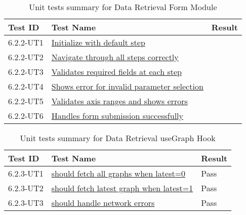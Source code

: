 \documentclass[12pt, titlepage]{article}
\begin{document}
\begin{table}[H]
  \centering
  \begin{tabular}{|l|l|l|}
    \hline
    \textbf{Test ID} & \textbf{Test Name} & \textbf{Result}\\
    \hline
    6.2.2-UT1 & \href{https://github.com/SumanyaG/Alkalytics/blob/documentation/VnV/src/frontend/test/components/modals/DataFormModel.test.tsx}{Initialize with default step} &  \\
    \hline
    6.2.2-UT2 & \href{https://github.com/SumanyaG/Alkalytics/blob/documentation/VnV/src/frontend/test/components/modals/DataFormModel.test.tsx}{Navigate through all steps correctly} &  \\
    \hline
    6.2.2-UT3 & \href{https://github.com/SumanyaG/Alkalytics/blob/documentation/VnV/src/frontend/test/components/modals/DataFormModel.test.tsx}{Validates required fields at each step} &  \\
    \hline
    6.2.2-UT4 & \href{https://github.com/SumanyaG/Alkalytics/blob/documentation/VnV/src/frontend/test/components/modals/DataFormModel.test.tsx}{Shows error for invalid parameter selection} &  \\
    \hline
    6.2.2-UT5 & \href{https://github.com/SumanyaG/Alkalytics/blob/documentation/VnV/src/frontend/test/components/modals/DataFormModel.test.tsx}{Validates axis ranges and shows errors} &  \\
    \hline
    6.2.2-UT6 & \href{https://github.com/SumanyaG/Alkalytics/blob/documentation/VnV/src/frontend/test/components/modals/DataFormModel.test.tsx}{Handles form submission successfully} &  \\
    \hline
  \end{tabular}
  \caption{Unit tests summary for Data Retrieval Form Module}
  \label{UT:DataRetrieval2}
\end{table}


\begin{table}[H]
  \centering
  \begin{tabular}{|l|l|l|}
    \hline
    \textbf{Test ID} & \textbf{Test Name} & \textbf{Result}\\
    \hline
    6.2.3-UT1 & \href{https://github.com/SumanyaG/Alkalytics/blob/documentation/VnV/src/frontend/test/components/modals/DataFormModel.test.tsx}{should fetch all graphs when latest=0} & Pass \\
    \hline
    6.2.3-UT2 & \href{https://github.com/SumanyaG/Alkalytics/blob/documentation/VnV/src/frontend/test/components/modals/DataFormModel.test.tsx}{should fetch latest graph when latest=1} & Pass \\
    \hline
    6.2.3-UT3 & \href{https://github.com/SumanyaG/Alkalytics/blob/documentation/VnV/src/frontend/test/components/modals/DataFormModel.test.tsx}{should handle network errors} & Pass \\
    \hline
  \end{tabular}
  \caption{Unit tests summary for Data Retrieval useGraph Hook}
  \label{UT:DataRetrieval3}
\end{table}
\end{document}
